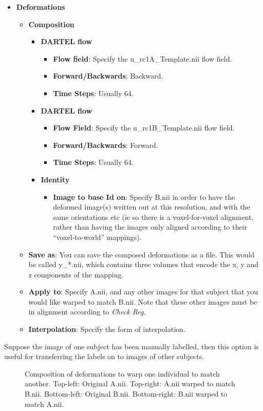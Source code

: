 \begin{itemize}
\item{{\bf Deformations}
  \begin{itemize}
  \item{{\bf Composition}
    \begin{itemize}
    \item{{\bf DARTEL flow}
      \begin{itemize}
      \item{{\bf Flow field}: Specify the u\_rc1A\_Template.nii flow field.}
      \item{{\bf Forward/Backwards}: Backward.}
      \item{{\bf Time Steps}: Usually 64.}
      \end{itemize}
    }
    \item{{\bf DARTEL flow}
      \begin{itemize}
      \item{{\bf Flow Field}: Specify the u\_rc1B\_Template.nii flow field.}
      \item{{\bf Forward/Backwards}: Forward.}
      \item{{\bf Time Steps}: Usually 64.}
      \end{itemize}
    }
    \item{{\bf Identity}
      \begin{itemize}
      \item{{\bf Image to base Id on}: Specify B.nii in order to have the deformed image(s) written out at this resolution, and with the same orientations etc (ie so there is a voxel-for-voxel alignment, rather than having the images only aligned according to their ``voxel-to-world'' mappings).}
      \end{itemize}
    }
    \end{itemize}
  }
  \item{{\bf Save as}: You can save the composed deformations as a file. This would be called y\_*.nii, which contains three volumes that encode the x, y and z components of the mapping.}
  \item{{\bf Apply to}: Specify A.nii, and any other images for that subject that you would like warped to match B.nii. Note that these other images must be in alignment according to \emph{Check Reg}.}
  \item{{\bf Interpolation}: Specify the form of interpolation.}
  \end{itemize}
}
\end{itemize}

Suppose the image of one subject has been manually labelled, then this option is useful for transferring the labels on to images of other subjects.

\begin{figure}
\begin{center}
\end{center}
\caption{
Composition of deformations to warp one individual to match another.
Top-left: Original A.nii.
Top-right: A.nii warped to match B.nii.
Bottom-left: Original B.nii.
Bottom-right: B.nii warped to match A.nii.
\label{Fig:AtoB}}
\end{figure}


